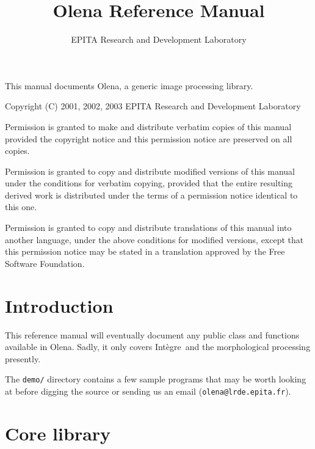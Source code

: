 \documentclass{book}
\newcommand\var\textit
\newcommand{\integre}{Int\`egre}
\begin{document}
\title{Olena Reference Manual}
\author{EPITA Research and Development Laboratory}
\maketitle


This manual documents Olena, a generic image processing library.

Copyright (C) 2001, 2002, 2003  EPITA Research and Development Laboratory

Permission is granted to make and distribute verbatim
copies of this manual provided the copyright notice and
this permission notice are preserved on all copies.


Permission is granted to copy and distribute modified versions of this
manual under the conditions for verbatim copying, provided that the
entire resulting derived work is distributed under the terms of a
permission notice identical to this one.

Permission is granted to copy and distribute
translations of this manual into another language,
under the above conditions for modified versions,
except that this permission notice may be stated in a
translation approved by the Free Software Foundation.

\newpage

\tableofcontents

\newpage

\chapter{Introduction}

This reference manual will eventually document any public class and
functions available in Olena. Sadly, it only covers \integre\ and the
morphological processing presently.

The \texttt{demo/} directory contains a few sample programs that may be
worth looking at before digging the source or sending us an email
(\texttt{olena@lrde.epita.fr}).

\chapter{Core library}
\end{document}
